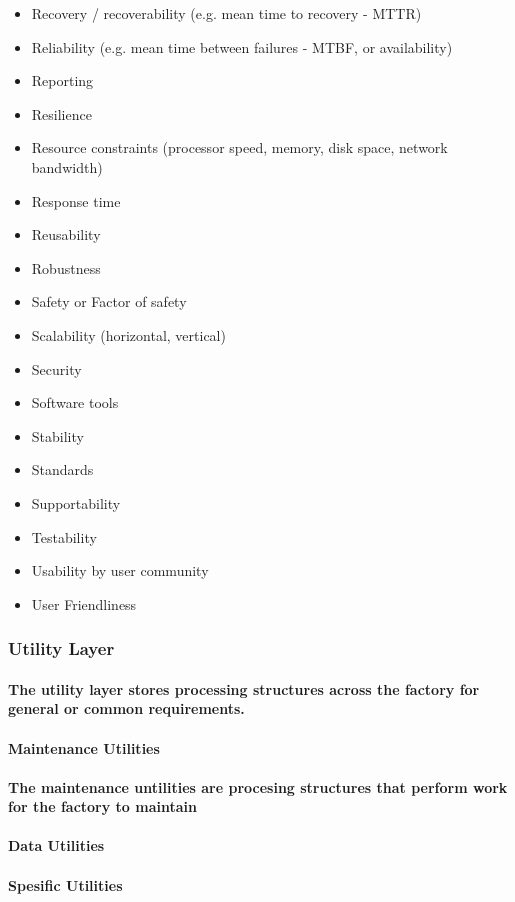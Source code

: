 \documentclass{acm_proc_article-sp}
\begin{document}
\begin{itemize}
\item Recovery / recoverability (e.g. mean time to recovery - MTTR)
\item Reliability (e.g. mean time between failures - MTBF, or availability)
\item Reporting
\item Resilience
\item Resource constraints (processor speed, memory, disk space, network bandwidth)
\item Response time
\item Reusability
\item Robustness
\item Safety or Factor of safety
\item Scalability (horizontal, vertical)
\item Security
\item Software tools
\item Stability
\item Standards
\item Supportability
\item Testability
\item Usability by user community
\item User Friendliness
\end{itemize}
\subsubsection{Utility Layer}
\paragraph{The utility layer stores processing structures across the factory for general or common requirements.}
\paragraph{Maintenance Utilities}
\paragraph{The maintenance untilities are procesing structures that perform work for the factory to maintain}
\paragraph{Data Utilities}
\paragraph{Spesific Utilities}
\end{document}
